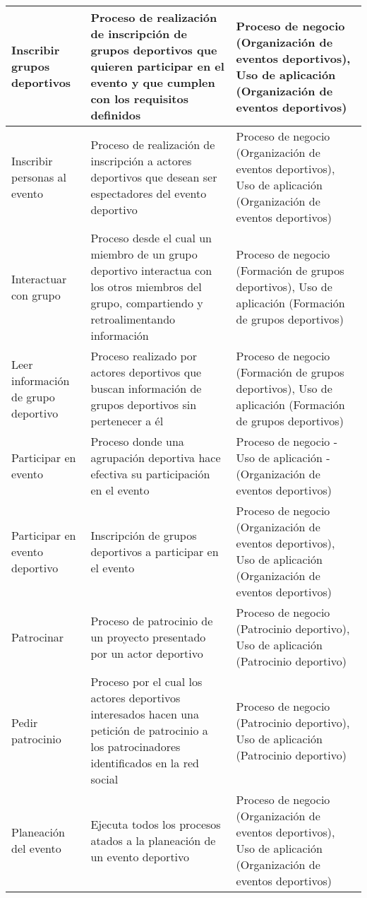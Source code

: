 \begin{center}
\begin{longtable}{|p{4cm}|p{7cm}|p{4cm}|}
		\\
		\hline
		Inscribir grupos deportivos & 
		Proceso de realización de inscripción de grupos deportivos que quieren participar en el evento y que cumplen con los requisitos definidos & 
		Proceso de negocio (Organización de eventos deportivos), Uso de aplicación (Organización de eventos deportivos)
		\\
		\hline
		Inscribir personas al evento & 
		Proceso de realización de inscripción a actores deportivos que desean ser espectadores del evento deportivo & 
		Proceso de negocio (Organización de eventos deportivos), Uso de aplicación (Organización de eventos deportivos)
		\\
		\hline
		Interactuar con grupo & 
		Proceso desde el cual un miembro de un grupo deportivo interactua con los otros miembros del grupo, compartiendo y retroalimentando información & 
		Proceso de negocio (Formación de grupos deportivos), Uso de aplicación (Formación de grupos deportivos)
		\\
		\hline
		Leer información de grupo deportivo & 
		Proceso realizado por actores deportivos que buscan información de grupos deportivos sin pertenecer a él & 
		Proceso de negocio (Formación de grupos deportivos), Uso de aplicación (Formación de grupos deportivos)
		\\
		\hline
		Participar en evento & 
		Proceso donde una agrupación deportiva hace efectiva su participación en el evento & 
		Proceso de negocio - Uso de aplicación - (Organización de eventos deportivos)
		\\
		\hline
		Participar en evento deportivo & 
		Inscripción de grupos deportivos a participar en el evento & 
		Proceso de negocio (Organización de eventos deportivos), Uso de aplicación (Organización de eventos deportivos)
		\\
		\hline
		Patrocinar & 
		Proceso de patrocinio de un proyecto presentado por un actor deportivo & 
		Proceso de negocio (Patrocinio deportivo), Uso de aplicación (Patrocinio deportivo)
		\\
		\hline
		Pedir patrocinio & 
		Proceso por el cual los actores deportivos interesados hacen una petición de patrocinio a los patrocinadores identificados en la red social & 
		Proceso de negocio (Patrocinio deportivo), Uso de aplicación (Patrocinio deportivo)
		\\
		\hline
		Planeación del evento & 
		Ejecuta todos los procesos atados a la planeación de un evento deportivo & 
		Proceso de negocio (Organización de eventos deportivos), Uso de aplicación (Organización de eventos deportivos)

\end{longtable}
\end{center}
